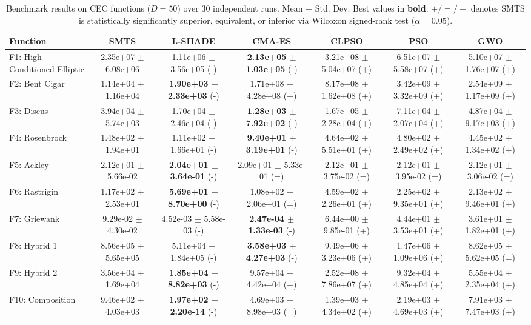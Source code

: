\documentclass[journal]{IEEEtran}
\begin{document}
\begin{table}[t]
\centering
\caption{Benchmark results on CEC functions ($D = 50$) over 30 independent runs. Mean $\pm$ Std. Dev. Best values in \textbf{bold}. $+/=/-$ denotes SMTS is statistically significantly superior, equivalent, or inferior via Wilcoxon signed-rank test ($\alpha = 0.05$).}
\label{tab:results_D50}
\scriptsize
\begin{tabular}{lcccccc}
\hline
Function & \textbf{SMTS} & \textbf{L-SHADE} & \textbf{CMA-ES} & \textbf{CLPSO} & \textbf{PSO} & \textbf{GWO} \\
\hline
F1: High-Conditioned Elliptic & 2.35e+07 $\pm$ 6.08e+06 & 1.11e+06 $\pm$ 3.56e+05 (-) & \textbf{2.13e+05 $\pm$ 1.03e+05} (-) & 3.21e+08 $\pm$ 5.04e+07 (+) & 6.51e+07 $\pm$ 5.58e+07 (+) & 5.10e+07 $\pm$ 1.76e+07 (+) \\
F2: Bent Cigar & 1.14e+04 $\pm$ 1.16e+04 & \textbf{1.90e+03 $\pm$ 2.33e+03} (-) & 1.71e+08 $\pm$ 4.28e+08 (+) & 8.17e+08 $\pm$ 1.62e+08 (+) & 3.42e+09 $\pm$ 3.32e+09 (+) & 2.54e+09 $\pm$ 1.17e+09 (+) \\
F3: Discus & 3.94e+04 $\pm$ 5.74e+03 & 1.70e+04 $\pm$ 2.46e+04 (-) & \textbf{1.28e+03 $\pm$ 7.92e+02} (-) & 1.67e+05 $\pm$ 2.28e+04 (+) & 7.11e+04 $\pm$ 2.07e+04 (+) & 4.87e+04 $\pm$ 9.17e+03 (+) \\
F4: Rosenbrock & 1.48e+02 $\pm$ 1.94e+01 & 1.11e+02 $\pm$ 1.66e+01 (-) & \textbf{9.40e+01 $\pm$ 3.19e+01} (-) & 4.64e+02 $\pm$ 5.51e+01 (+) & 4.80e+02 $\pm$ 2.49e+02 (+) & 4.45e+02 $\pm$ 1.34e+02 (+) \\
F5: Ackley & 2.12e+01 $\pm$ 5.66e-02 & \textbf{2.04e+01 $\pm$ 3.64e-01} (-) & 2.09e+01 $\pm$ 5.33e-01 (=) & 2.12e+01 $\pm$ 3.75e-02 (=) & 2.12e+01 $\pm$ 3.95e-02 (=) & 2.12e+01 $\pm$ 3.06e-02 (=) \\
F6: Rastrigin & 1.17e+02 $\pm$ 2.53e+01 & \textbf{5.69e+01 $\pm$ 8.70e+00} (-) & 1.08e+02 $\pm$ 2.06e+01 (=) & 4.59e+02 $\pm$ 2.26e+01 (+) & 2.25e+02 $\pm$ 9.35e+01 (+) & 2.13e+02 $\pm$ 9.46e+01 (+) \\
F7: Griewank & 9.29e-02 $\pm$ 4.30e-02 & 4.52e-03 $\pm$ 5.58e-03 (-) & \textbf{2.47e-04 $\pm$ 1.33e-03} (-) & 6.44e+00 $\pm$ 9.85e-01 (+) & 4.44e+01 $\pm$ 3.53e+01 (+) & 3.61e+01 $\pm$ 1.82e+01 (+) \\
F8: Hybrid 1 & 8.56e+05 $\pm$ 5.65e+05 & 5.11e+04 $\pm$ 1.84e+05 (-) & \textbf{3.58e+03 $\pm$ 4.27e+03} (-) & 9.49e+06 $\pm$ 3.23e+06 (+) & 1.47e+06 $\pm$ 1.09e+06 (+) & 8.62e+05 $\pm$ 5.62e+05 (=) \\
F9: Hybrid 2 & 3.56e+04 $\pm$ 1.69e+04 & \textbf{1.85e+04 $\pm$ 8.82e+03} (-) & 9.57e+04 $\pm$ 4.42e+04 (+) & 2.52e+08 $\pm$ 7.86e+07 (+) & 9.32e+04 $\pm$ 4.85e+04 (+) & 5.55e+04 $\pm$ 2.35e+04 (+) \\
F10: Composition & 9.46e+02 $\pm$ 4.03e+03 & \textbf{1.97e+02 $\pm$ 2.20e-14} (-) & 4.69e+03 $\pm$ 8.98e+03 (=) & 1.39e+03 $\pm$ 4.34e+02 (+) & 2.19e+03 $\pm$ 4.69e+03 (+) & 7.91e+03 $\pm$ 7.47e+03 (+) \\
\hline
\end{tabular}
\end{table}
\end{document}
